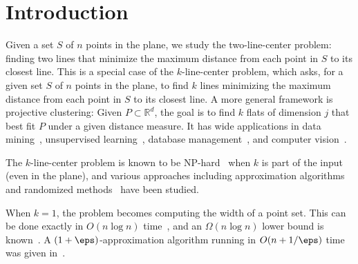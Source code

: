 \section{Introduction}


Given a set $S$ of $n$ points in the plane, we study the two-line-center problem: finding two lines that minimize the maximum distance from each point in $S$ to its closest line.  
This is a special case of the $k$-line-center problem, which asks, for a given set $S$ of $n$ points in the plane, to find $k$ lines minimizing the maximum distance from each point in $S$ to its closest line.  
A more general framework is projective clustering: Given $P\subset \mathbb R^d$, the goal is to find $k$ flats of dimension $j$ that best fit $P$ under a given distance measure. 
It has wide applications in data mining~\cite{datamining1999, datamining2000}, unsupervised learning~\cite{Procopiuc2010unsupervised}, database management~\cite{Chakrabarti2000db}, and computer vision~\cite{Procopiuc2002cv}.  

The $k$-line-center problem is known to be NP-hard~\cite{Megiddo1982pc_npcomplete} when $k$ is part of the input (even in the plane), 
and various approaches including approximation algorithms and randomized methods~\cite{  pc_apx_dklogk, agarwal2005approximation, pc_shapefitting_cylinder,pc_shapefitting_box, chan2006faster,  pc_greedy_number_apx, pc_fixedkq,HASSIN199129_pc_hitting, pc_montecarlo} have been studied.  


When $k=1$, the problem becomes computing the width of a point set.  
This can be done exactly in $O(n\log n)$ time~\cite{Shamos:1978:CG:width}, and an $\Omega(n\log n)$ lower bound is known~\cite{lee1986geometric}.  
A $(1+\eps)$-approximation algorithm running in $O(n + 1/\eps)$ time was given in~\cite{chan2006faster}.

